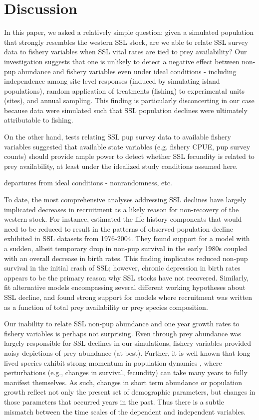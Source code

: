 \documentclass[nonumbib,leqno]{nrc1}
\begin{document}
\section{Discussion}

In this paper, we asked a relatively simple question: given a simulated population that strongly resembles the western SSL stock, are we able to relate SSL survey data to fishery variables when SSL vital rates are tied to prey availability? Our investigation suggests that one is unlikely to detect a negative effect between non-pup abundance and fishery variables even under ideal conditions - including independence among site level responses (induced by simulating island populations), random application of treatments (fishing) to experimental units (sites), and annual sampling.  This finding is particularly disconcerting in our case because data were simulated such that SSL population declines were ultimately attributable to fishing.

On the other hand, tests relating SSL pup survey data to available fishery variables suggested that available state variables (e.g. fishery CPUE, pup survey counts) should provide ample power to detect whether SSL fecundity is related to prey availability, at least under the idealized study conditions assumed here.


departures from ideal conditions - nonrandomness, etc.

To date, the most comprehensive analyses addressing SSL declines have largely implicated decreases in recruitment as a likely reason for non-recovery of the western stock.  For instance, \citet{HolmesEtAl2007} estimated the life history components that would need to be reduced to result in
the patterns of observed population decline exhibited in SSL datasets from 1976-2004.  They found support for a model with a sudden, albeit temporary drop in non-pup survival in the early 1980s coupled with an overall decrease in birth rates.  This finding implicates reduced non-pup survival in the initial crash of SSL; however, chronic depression in birth rates appears to be the primary reason why SSL stocks have not recovered.  Similarly, \citet{Wolf:2008qf} fit alternative models encompassing several different working hypotheses about SSL decline, and found strong support for models where recruitment was written as a function of total prey availability or prey species composition.

Our inability to relate SSL non-pup abundance and one year growth rates to fishery variables is perhaps not surprising.  Even through prey abundance was largely responsible for SSL declines in our simulations, fishery variables provided noisy depictions of prey abundance (at best).  Further, it is well known that long lived species exhibit strong momentum in population dynamics \citep[see][for a review]{EzardEtAl2010}, where perturbations (e.g., changes in survival, fecundity) can take many years to fully manifest themselves.  As such, changes in short term abundance or population growth reflect not only the present set of demographic parameters, but changes in those parameters that occurred years in the past.  Thus there is a subtle mismatch between the time scales of the dependent and independent variables.
\end{document}
